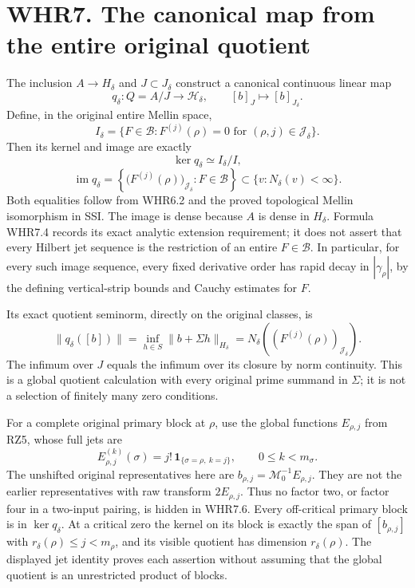 \section{WHR7. The canonical map from the entire original
quotient}\label{whr7.-the-canonical-map-from-the-entire-original-quotient}

The inclusion \(A\to H_\delta\) and \(J\subset J_\delta\) construct a
canonical continuous linear map \[
 q_\delta:Q=A/J\longrightarrow\mathcal H_\delta,
 \qquad [b]_J\longmapsto[b]_{J_\delta}.
 \tag{WHR7.1}
\] Define, in the original entire Mellin space, \[
 I_\delta=\{F\in\mathcal B:
 F^{(j)}(\rho)=0\text{ for }(\rho,j)\in\mathscr J_\delta\}.
 \tag{WHR7.2}
\] Then its kernel and image are exactly \[
 \boxed{\ker q_\delta\simeq I_\delta/I,}
 \tag{WHR7.3}
\] \[
 \boxed{\operatorname{im}q_\delta
   =\left\{\bigl(F^{(j)}(\rho)\bigr)_{\mathscr J_\delta}:
                                       F\in\mathcal B\right\}
       \subset\{v:N_\delta(v)<\infty\}.}
 \tag{WHR7.4}
\] Both equalities follow from WHR6.2 and the proved topological Mellin
isomorphism in SSI. The image is dense because \(A\) is dense in
\(H_\delta\). Formula WHR7.4 records its exact analytic extension
requirement; it does not assert that every Hilbert jet sequence is the
restriction of an entire \(F\in\mathcal B\). In particular, for every
such image sequence, every fixed derivative order has rapid decay in
\(|\gamma_\rho|\), by the defining vertical-strip bounds and Cauchy
estimates for \(F\).

Its exact quotient seminorm, directly on the original classes, is \[
 \|q_\delta([b])\|=
 \inf_{h\in S}\|b+\Sigma h\|_{H_\delta}
 =N_\delta\!\left((F^{(j)}(\rho))_{\mathscr J_\delta}\right).
 \tag{WHR7.5}
\] The infimum over \(J\) equals the infimum over its closure by norm
continuity. This is a global quotient calculation with every original
prime summand in \(\Sigma\); it is not a selection of finitely many zero
conditions.

For a complete original primary block at \(\rho\), use the global
functions \(E_{\rho,j}\) from RZ5, whose full jets are \[
 E_{\rho,j}^{(k)}(\sigma)
       =j!\,\mathbf1_{\{\sigma=\rho,\ k=j\}},
 \qquad 0\leq k<m_\sigma.
 \tag{WHR7.6}
\] The unshifted original representatives here are
\(b_{\rho,j}=\mathcal M_0^{-1}E_{\rho,j}\). They are not the earlier
representatives with raw transform \(2E_{\rho,j}\). Thus no factor two,
or factor four in a two-input pairing, is hidden in WHR7.6. Every
off-critical primary block is in \(\ker q_\delta\). At a critical zero
the kernel on its block is exactly the span of \([b_{\rho,j}]\) with
\(r_\delta(\rho)\leq j<m_\rho\), and its visible quotient has dimension
\(r_\delta(\rho)\). The displayed jet identity proves each assertion
without assuming that the global quotient is an unrestricted product of
blocks.


